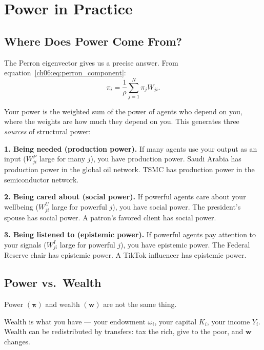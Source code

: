 \documentclass[../structural_economics_book.tex]{subfiles}
\begin{document}
\section{Power in Practice}
\label{ch06:sec:practice}

\subsection{Where Does Power Come From?}

The Perron eigenvector gives us a precise answer. From equation~\eqref{ch06:eq:perron_component}:
\begin{equation}
\pi_i = \frac{1}{\rho} \sum_{j=1}^N \pi_j W_{ji}.
\end{equation}

Your power is the weighted sum of the power of agents who depend on you, where the weights are how much they depend on you. This generates three \textit{sources} of structural power:

\textbf{1. Being needed (production power).} If many agents use your output as an input ($W^P_{ji}$ large for many $j$), you have production power. Saudi Arabia has production power in the global oil network. TSMC has production power in the semiconductor network.

\textbf{2. Being cared about (social power).} If powerful agents care about your wellbeing ($W^U_{ji}$ large for powerful $j$), you have social power. The president's spouse has social power. A patron's favored client has social power.

\textbf{3. Being listened to (epistemic power).} If powerful agents pay attention to your signals ($W^I_{ji}$ large for powerful $j$), you have epistemic power. The Federal Reserve chair has epistemic power. A TikTok influencer has epistemic power.

\subsection{Power vs.\ Wealth}

Power $(\boldsymbol{\pi})$ and wealth $(\mathbf{w})$ are not the same thing.

Wealth is what you have --- your endowment $\omega_i$, your capital $K_i$, your income $Y_i$. Wealth can be redistributed by transfers: tax the rich, give to the poor, and $\mathbf{w}$ changes.
\end{document}
